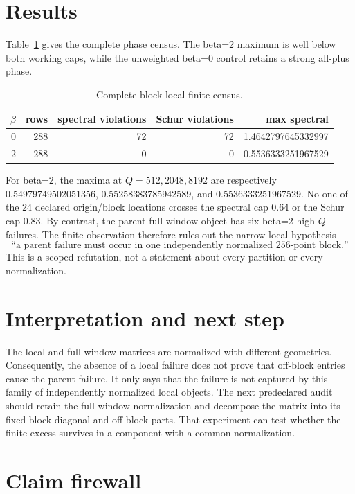 \documentclass[10pt]{article}
\begin{document}
\section{Results}

Table~\ref{tab:census} gives the complete phase census.  The beta=2 maximum is
well below both working caps, while the unweighted beta=0 control retains a
strong all-plus phase.

\begin{table}[h]
\centering
\caption{Complete block-local finite census.}
\label{tab:census}
\begin{tabular}{@{}rrrrr@{}}
\toprule
\(\beta\) & rows & spectral violations & Schur violations & max spectral\\
\midrule
0 & 288 & 72 & 72 & 1.4642797645332997\\
2 & 288 & 0 & 0 & 0.5536333251967529\\
\bottomrule
\end{tabular}
\end{table}

For beta=2, the maxima at \(Q=512,2048,8192\) are respectively
0.54979749502051356, 0.55258383785942589, and 0.5536333251967529.  No one of
the 24 declared origin/block locations crosses the spectral cap 0.64 or the
Schur cap 0.83.  By contrast, the parent full-window object has six beta=2
high-\(Q\) failures.  The finite observation therefore rules out the narrow
local hypothesis
\[
 \text{``a parent failure must occur in one independently normalized
  256-point block.''}
\]
This is a scoped refutation, not a statement about every partition or every
normalization.

\section{Interpretation and next step}

The local and full-window matrices are normalized with different geometries.
Consequently, the absence of a local failure does not prove that off-block
entries cause the parent failure.  It only says that the failure is not
captured by this family of independently normalized local objects.  The next
predeclared audit should retain the full-window normalization and decompose
the matrix into its fixed block-diagonal and off-block parts.  That experiment
can test whether the finite excess survives in a component with a common
normalization.

\section{Claim firewall}
\end{document}

